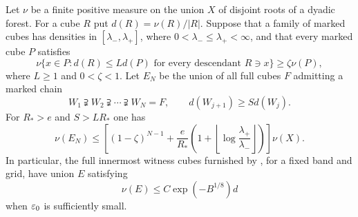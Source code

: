 \begin{lemma}\label{pk:packing}
Let $\nu$ be a finite positive measure on the union $X$ of
disjoint roots of a dyadic forest.  For a cube $R$ put
$d(R)=\nu(R)/|R|$.  Suppose that a family of marked cubes has
densities in $[\lambda_-,\lambda_+]$, where
$0<\lambda_-\le\lambda_+<\infty$, and that every marked
cube $P$ satisfies
\begin{equation}\label{pk:abstract-payment}
 \nu\{x\in P:d(R)\le Ld(P)
       \text{ for every descendant }R\ni x\}
       \ge\zeta\nu(P),
\end{equation}
where $L\ge1$ and $0<\zeta<1$.
Let $E_N$ be the union of all full cubes $F$ admitting a
marked chain
\[
 W_1\supsetneqq W_2\supsetneqq\cdots\supsetneqq W_N=F,
 \qquad d(W_{j+1})\ge S d(W_j).
\]
For $R_*>e$ and $S>LR_*$ one has
\begin{equation}\label{pk:abstract-packing}
 \nu(E_N)\le
 \left[(1-\zeta)^{N-1}
 +\frac{e}{R_*}\left(1+
      \left\lfloor\log\frac{\lambda_+}{\lambda_-}\right\rfloor
                  \right)\right]\nu(X).
\end{equation}
In particular, the full innermost witness cubes furnished by
, for a fixed band and grid, have
union $E$ satisfying
\begin{equation}\label{pk:packed-witnesses}
 \nu(E)\le C\exp(-B^{1/8})d
\end{equation}
when $\varepsilon_0$ is sufficiently small.
\end{lemma}

